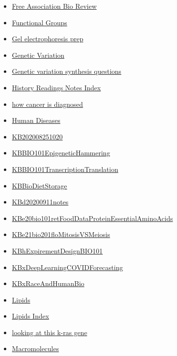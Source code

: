 \documentclass[11pt]{article}
\begin{document}
\begin{itemize}
\begin{itemize}
\begin{itemize}
\item \href{biology/bio10/KBFreeAssociationBioReviewHuxley.org}{Free Association Bio Review}
\item \href{biology/bio10/KBhBIO101FunctionalGroups.org}{Functional Groups}
\item \href{biology/bio10/KBxGelElectrophoresisPrep.org}{Gel electrophoresis prep}
\item \href{biology/bio10/KBhBIO101GeneticVariation.org}{Genetic Variation}
\item \href{biology/bio10/KBxGeneticVariationMA.org}{Genetic variation synthesis questions}
\item \href{biology/bio10/KB20200826173039.org}{History Readings Notes Index}
\item \href{biology/bio10/KBrefCancerDiagnosisSteps.org}{how cancer is diagnosed}
\item \href{biology/bio10/KBhBIO101HumanDiseases.org}{Human Diseases}
\item \href{biology/bio10/KB202008251020.org}{KB202008251020}
\item \href{biology/bio10/KBBIO101EpigeneticHammering.org}{KBBIO101EpigeneticHammering}
\item \href{biology/bio10/KBBIO101TranscriptionTranslation.org}{KBBIO101TranscriptionTranslation}
\item \href{biology/bio10/KBBioDietStorage.org}{KBBioDietStorage}
\item \href{biology/bio10/KBd20200911notes.org}{KBd20200911notes}
\item \href{biology/bio10/KBe20bio101retFoodDataProteinEssentialAminoAcids.org}{KBe20bio101retFoodDataProteinEssentialAminoAcids}
\item \href{biology/bio10/KBe21bio201floMitosisVSMeiosis.org}{KBe21bio201floMitosisVSMeiosis}
\item \href{biology/bio10/KBhExpirementDesignBIO101.org}{KBhExpirementDesignBIO101}
\item \href{biology/bio10/KBxDeepLearningCOVIDForecasting.org}{KBxDeepLearningCOVIDForecasting}
\item \href{biology/bio10/KBxRaceAndHumanBio.org}{KBxRaceAndHumanBio}
\item \href{biology/bio10/KBhBIO101Lipids.org}{Lipids}
\item \href{biology/bio10/KBe2020bio101refLipids.org}{Lipids Index}
\item \href{biology/bio10/KBe21bio201floKRASgeneMutationCellCycleAndCancer.org}{looking at this k-ras gene}
\item \href{biology/bio10/KBhBIO101Macromolecules.org}{Macromolecules}

\end{itemize}
\end{itemize}
\end{itemize}
\end{document}
